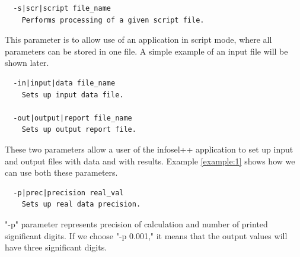 \documentclass[a4paper,fleqn]{report}
\begin{document}
\begin{scriptsize}
 \begin{verbatim}
  -s|scr|script file_name
    Performs processing of a given script file.
 \end{verbatim}
\end{scriptsize}
  This parameter is to allow use of an application in script mode, 
where all parameters can be stored in one file. A simple example of an input file will be shown later. 

\begin{scriptsize}
 \begin{verbatim}
  -in|input|data file_name
    Sets up input data file.

  -out|output|report file_name
    Sets up output report file.
 \end{verbatim}
\end{scriptsize}
  These two parameters allow a user of the infosel++ application to set up input and output files with data and with results. 
Example \ref{example:1} shows how we can use both these parameters.

\begin{scriptsize}
 \begin{verbatim}
  -p|prec|precision real_val
    Sets up real data precision.
 \end{verbatim}
\end{scriptsize}
  "-p" parameter represents precision of calculation and number of printed significant digits. If we choose "-p 0.001," it means 
that the output values will have three significant digits.
\end{document}
